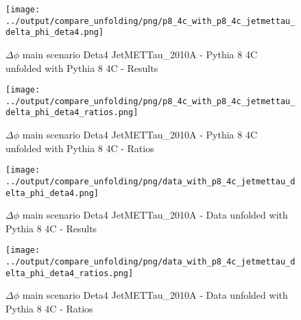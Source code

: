 \documentclass[11pt]{book}
\begin{document}
\begin{figure}[ht]
\centering
\texttt{[image: ../output/compare\_unfolding/png/p8\_4c\_with\_p8\_4c\_jetmettau\_delta\_phi\_deta4.png]}
\caption{$\Delta\phi$ main scenario Deta4 JetMETTau\_2010A - Pythia 8 4C unfolded with Pythia 8 4C - Results}
\label{p8_p8_jetmettau_delta_phi_deta4_a}
\end{figure}

\begin{figure}[ht]
\centering
\texttt{[image: ../output/compare\_unfolding/png/p8\_4c\_with\_p8\_4c\_jetmettau\_delta\_phi\_deta4\_ratios.png]}
\caption{$\Delta\phi$ main scenario Deta4 JetMETTau\_2010A - Pythia 8 4C unfolded with Pythia 8 4C - Ratios}
\label{p8_p8_jetmettau_delta_phi_deta4_b}
\end{figure}

\begin{comment}

\begin{figure}[ht]
\centering
\texttt{[image: ../output/compare\_unfolding/png/p6\_z2\_with\_p8\_4c\_jetmettau\_delta\_phi\_deta4.png]}
\caption{$\Delta\phi$ main scenario Deta4 JetMETTau\_2010A - Pythia 6 Z2* unfolded with Pythia 8 4C - Results}
\label{p6_p8_jetmettau_delta_phi_deta4_a}
\end{figure}

\begin{figure}[ht]
\centering
\texttt{[image: ../output/compare\_unfolding/png/p6\_z2\_with\_p8\_4c\_jetmettau\_delta\_phi\_deta4\_ratios.png]}
\caption{$\Delta\phi$ main scenario Deta4 JetMETTau\_2010A - Pythia 6 Z2* unfolded with Pythia 8 4C - Ratios}
\label{p6_p8_jetmettau_delta_phi_deta4_b}
\end{figure}

\end{comment}

\begin{figure}[ht]
\centering
\texttt{[image: ../output/compare\_unfolding/png/data\_with\_p8\_4c\_jetmettau\_delta\_phi\_deta4.png]}
\caption{$\Delta\phi$ main scenario Deta4 JetMETTau\_2010A - Data unfolded with Pythia 8 4C - Results}
\label{data_p8_jetmettau_delta_phi_deta4_a}
\end{figure}

\begin{figure}[ht]
\centering
\texttt{[image: ../output/compare\_unfolding/png/data\_with\_p8\_4c\_jetmettau\_delta\_phi\_deta4\_ratios.png]}
\caption{$\Delta\phi$ main scenario Deta4 JetMETTau\_2010A - Data unfolded with Pythia 8 4C - Ratios}
\label{data_p8_jetmettau_delta_phi_deta4_b}
\end{figure}
\end{document}
